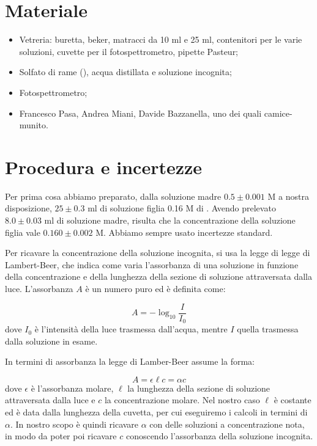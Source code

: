 \section*{Materiale}

\begin{itemize}
        \setlength{\parskip}{-1pt}
        \item{Vetreria: buretta, beker, matracci da 10 ml e 25 ml,
            contenitori per le varie soluzioni, cuvette per il fotospettrometro,
            pipette Pasteur;}
        \item{Solfato di rame (), acqua distillata e soluzione incognita;}
        \item{Fotospettrometro;}
        \item{Francesco Pasa, Andrea Miani, Davide Bazzanella, uno dei quali camice-munito.}
\end{itemize}

\section*{Procedura e incertezze}

Per prima cosa abbiamo preparato, dalla soluzione madre $0.5 \pm 0.001$ M a
nostra disposizione, $25 \pm 0.3$ ml di soluzione figlia 0.16 M
di . Avendo prelevato $8.0 \pm 0.03$ ml di soluzione madre, risulta che
la concentrazione della soluzione figlia vale $0.160 \pm 0.002 $ M. Abbiamo sempre
usato incertezze standard.

Per ricavare la concentrazione della soluzione incognita, si usa la legge di legge
di Lambert-Beer, che indica come varia l'assorbanza di una soluzione in funzione
della concentrazione e della lunghezza della sezione di soluzione attraversata dalla luce.
L'assorbanza $A$ è un numero puro ed è definita come:

\begin{equation}
    A = - \log_{10}{\frac{I}{I_0}}
    \label{eq:ass}
\end{equation}
%
dove $I_0$ è l'intensità della luce trasmessa dall'acqua, mentre $I$ quella trasmessa
dalla soluzione in esame.

In termini di assorbanza la legge di Lamber-Beer assume la forma:

\begin{equation}
    A = \epsilon \ell c = \alpha c
    \label{eq:lambeer}
\end{equation}
%
dove $\epsilon$ è l'assorbanza molare, $\ell$ la lunghezza della sezione di soluzione
attraversata dalla luce e $c$ la concentrazione molare. Nel nostro caso $\ell$ è costante
ed è data dalla lunghezza della cuvetta, per cui eseguiremo i calcoli in termini di
$\alpha$. In nostro scopo è quindi ricavare $\alpha$ con delle soluzioni a concentrazione
nota, in modo da poter poi ricavare $c$ conoscendo l'assorbanza della soluzione
incognita.

